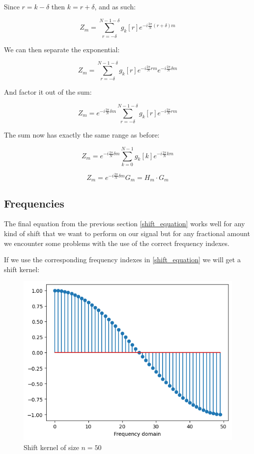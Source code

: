 \documentclass[]{usiinfbachelorproject}
\begin{document}
	Since $r = k - \delta$ then $ k = r + \delta$, and as such:
	
	\begin{equation*}
		Z_m = \displaystyle\sum_{r= -\delta}^{N-1 - \delta}g_k[r]e^{-i \frac{2\pi}{N} (r + \delta)m}
	\end{equation*}
	
	We can then separate the exponential:
	
	\begin{equation*}
		Z_m = \displaystyle\sum_{r= -\delta}^{N-1 - \delta}g_k[r]e^{-i \frac{2\pi}{N} rm}e^{-i \frac{2\pi}{N}  \delta m}
	\end{equation*}
	
	And factor it out of the sum:
	
	\begin{equation*}
		Z_m = e^{-i \frac{2\pi}{N}  \delta m} \displaystyle\sum_{r= -\delta}^{N-1 - \delta}g_k[r]e^{-i \frac{2\pi}{N} rm}
	\end{equation*}
	
	The sum now has exactly the same range as before:
	
	\begin{equation*}
		Z_m = e^{-i \frac{2\pi}{N}  \delta m} \displaystyle\sum_{k=0}^{N-1}g_k[k]e^{-i \frac{2\pi}{N} km}
	\end{equation*}
	
	\begin{equation}
		Z_m = e^{-i \frac{2\pi}{N}  \delta m} G_m = H_m \cdot G_m \label{shift_equation}
	\end{equation}
	
	\subsection{Frequencies}
	The final equation from the previous section \ref{shift_equation} works well for any kind of shift that we want to perform on our signal but for any fractional amount we encounter some problems with the use of the correct frequency indexes.
	
	If we use the corresponding frequency indexes in \ref{shift_equation} we will get a shift kernel:
	\begin{figure}[h]
		\centering
		\includegraphics[width=0.5\columnwidth]{images/Results/phase_shift_bad.png}
		\caption{Shift kernel of size $n=50$}
	\end{figure}
	
\end{document}
